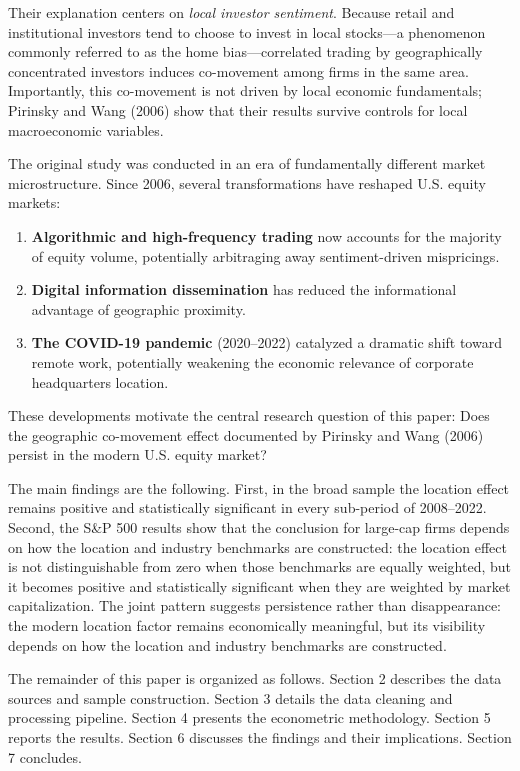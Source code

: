 \documentclass[
  12pt,
]{article}
\providecommand{\tightlist}{%
  \setlength{\itemsep}{0pt}\setlength{\parskip}{0pt}}
\begin{document}
Their explanation centers on \emph{local investor sentiment}. Because
retail and institutional investors tend to choose to invest in local
stocks---a phenomenon commonly referred to as the home bias---correlated
trading by geographically concentrated investors induces co-movement
among firms in the same area. Importantly, this co-movement is not
driven by local economic fundamentals; Pirinsky and Wang (2006) show
that their results survive controls for local macroeconomic variables.

The original study was conducted in an era of fundamentally different
market microstructure. Since 2006, several transformations have reshaped
U.S. equity markets:

\begin{enumerate}
\def\labelenumi{\arabic{enumi}.}
\tightlist
\item
  \textbf{Algorithmic and high-frequency trading} now accounts for the
  majority of equity volume, potentially arbitraging away
  sentiment-driven mispricings.
\item
  \textbf{Digital information dissemination} has reduced the
  informational advantage of geographic proximity.
\item
  \textbf{The COVID-19 pandemic} (2020--2022) catalyzed a dramatic shift
  toward remote work, potentially weakening the economic relevance of
  corporate headquarters location.
\end{enumerate}

These developments motivate the central research question of this paper:
Does the geographic co-movement effect documented by Pirinsky and Wang
(2006) persist in the modern U.S. equity market?

The main findings are the following. First, in the broad sample the
location effect remains positive and statistically significant in every
sub-period of 2008--2022. Second, the S\&P 500 results show that the
conclusion for large-cap firms depends on how the location and industry
benchmarks are constructed: the location effect is not distinguishable
from zero when those benchmarks are equally weighted, but it becomes
positive and statistically significant when they are weighted by market
capitalization. The joint pattern suggests persistence rather than
disappearance: the modern location factor remains economically
meaningful, but its visibility depends on how the location and industry
benchmarks are constructed.

The remainder of this paper is organized as follows. Section 2 describes
the data sources and sample construction. Section 3 details the data
cleaning and processing pipeline. Section 4 presents the econometric
methodology. Section 5 reports the results. Section 6 discusses the
findings and their implications. Section 7 concludes.
\end{document}
